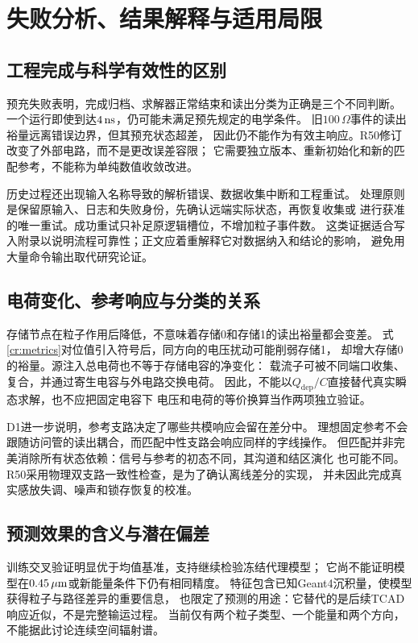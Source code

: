 \section{失败分析、结果解释与适用局限}
\label{cr:discussion}
\subsection{工程完成与科学有效性的区别}
预充失败表明，完成归档、求解器正常结束和读出分类为正确是三个不同判断。
一个运行即使到达$4\,\mathrm{ns}$，仍可能未满足预先规定的电学条件。
旧$100\,\Omega$事件的读出裕量远离错误边界，但其预充状态超差，
因此仍不能作为有效主响应。R50修订改变了外部电路，而不是更改误差容限；
它需要独立版本、重新初始化和新的匹配参考，不能称为单纯数值收敛改进。

历史过程还出现输入名称导致的解析错误、数据收集中断和工程重试。
处理原则是保留原输入、日志和失败身份，先确认远端实际状态，再恢复收集或
进行获准的唯一重试。成功重试只补足原逻辑槽位，不增加粒子事件数。
这类证据适合写入附录以说明流程可靠性；正文应着重解释它对数据纳入和结论的影响，
避免用大量命令输出取代研究论证。

\subsection{电荷变化、参考响应与分类的关系}
存储节点在粒子作用后降低，不意味着存储0和存储1的读出裕量都会变差。
式\eqref{cr:metrics}对位值引入符号后，同方向的电压扰动可能削弱存储1，
却增大存储0的裕量。源注入总电荷也不等于存储电容的净变化：
载流子可被不同端口收集、复合，并通过寄生电容与外电路交换电荷。
因此，不能以$Q_{\mathrm{dep}}/C$直接替代真实瞬态求解，也不应把固定电容下
电压和电荷的等价换算当作两项独立验证。

D1进一步说明，参考支路决定了哪些共模响应会留在差分中。
理想固定参考不会跟随访问管的读出耦合，而匹配中性支路会响应同样的字线操作。
但匹配并非完美消除所有状态依赖：信号与参考的初态不同，其沟道和结区演化
也可能不同。R50采用物理双支路一致性检查，是为了确认离线差分的实现，
并未因此完成真实感放失调、噪声和锁存恢复的校准。

\subsection{预测效果的含义与潜在偏差}
训练交叉验证明显优于均值基准，支持继续检验冻结代理模型；
它尚不能证明模型在$0.45\,\mu\mathrm{m}$或新能量条件下仍有相同精度。
特征包含已知Geant4沉积量，使模型获得粒子与路径差异的重要信息，
也限定了预测的用途：它替代的是后续TCAD响应近似，不是完整输运过程。
当前仅有两个粒子类型、一个能量和两个方向，不能据此讨论连续空间辐射谱。

